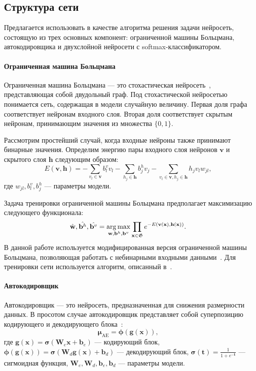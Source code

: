 \documentclass[12pt,twoside]{article}
\begin{document}
\subsection{Структура сети}
Предлагается использовать в качестве алгоритма решения задачи нейросеть, состоящую из трех основных компонент:
ограниченной машины Больцмана, автокодировщика и двухслойной нейросети с softmax-классификатором.
\paragraph{Ограниченная машина Больцмана}
Ограниченная машина Больцмана --- это стохастическая нейросеть~\cite{rbm}, представляющая собой двудольный граф. Под стохастической нейросетью понимается сеть, содержащая в модели случайную величину. Первая доля графа соответствует нейронам входного слоя. Вторая доля соответствует скрытым нейронам, принимающим значения из множества $\{0,1\}$.

Рассмотрим простейший случай, когда входные нейроны также  принимают бинарные значения. Определим энергию пары входного слоя нейронов $\mathbf{v}$ и скрытого слоя $\mathbf{h}$ следующим образом:
\[
    E(\mathbf{v},\mathbf{h}) = -\sum_{v_l \in \mathbf{v}}b_l^v v_l -\sum_{h_j \in \mathbf{h}}b_j^h v_j - \sum_{v_l \in \mathbf{v}, h_j \in \mathbf{h}} h_j v_l w_{jl},
\]
где $w_{jl}, b^v_l, b^h_j$ --- параметры модели.

Задача тренировки ограниченной машины Больцмана предполагает максимизацию следующего функционала:
\[
\hat{\mathbf{w}},\hat{\mathbf{b}^h},\hat{\mathbf{b}^v} = \argmax_{\mathbf{w}, \mathbf{b}^h, \mathbf{b}^v} \prod_{\mathbf{x} \in \mathfrak{G}} e^{-E(\mathbf{v(\mathbf{x})},\mathbf{h(\mathbf{x})})}.
\]
В данной работе используется модифицированная версия ограниченной машины Больцмана, позволяющая работать с небинарными входными данными~\cite{gbrbm}. Для тренировки сети используется алгоритм, описанный в~\cite{foundamentals}.

\paragraph{Автокодировщик}
Автокодировщик --- это нейросеть, предназначенная для снижения размерности данных.
В просотом случае автокодировщик представляет собой суперпозицию кодирующего и декодирующего блока~\cite{foundamentals}:
\[
    \mathbf{\mu}_\text{AE} = \mathbf{\phi}(\mathbf{g}(\mathbf{x})),
\]
где $\mathbf{g}(\mathbf{x}) = \mathbf{\sigma}(\mathbf{W}_e\mathbf{x}+\mathbf{b}_e)$ --- кодирующий блок, \\
$ \mathbf{\phi}(\mathbf{g}(\mathbf{x}))  = \mathbf{\sigma}(\mathbf{W}_d\mathbf{g}(\mathbf{x})+\mathbf{b}_d)$ --- декодирующий блок, $\mathbf{\sigma}(\mathbf{t}) = \frac{1}{1+e^{-\mathbf{t}}}$ --- сигмоидная функция, $\mathbf{W}_e,\mathbf{W}_d,\mathbf{b}_e, \mathbf{b}_d$ --- параметры модели.
\end{document}
